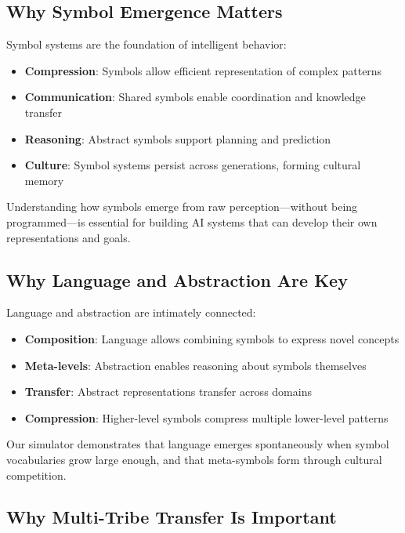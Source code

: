 \documentclass[11pt,a4paper]{article}
\begin{document}
\subsection{Why Symbol Emergence Matters}

Symbol systems are the foundation of intelligent behavior:

\begin{itemize}
    \item \textbf{Compression}: Symbols allow efficient representation of complex patterns
    \item \textbf{Communication}: Shared symbols enable coordination and knowledge transfer
    \item \textbf{Reasoning}: Abstract symbols support planning and prediction
    \item \textbf{Culture}: Symbol systems persist across generations, forming cultural memory
\end{itemize}

Understanding how symbols emerge from raw perception—without being programmed—is essential for building AI systems that can develop their own representations and goals.

\subsection{Why Language and Abstraction Are Key}

Language and abstraction are intimately connected:

\begin{itemize}
    \item \textbf{Composition}: Language allows combining symbols to express novel concepts
    \item \textbf{Meta-levels}: Abstraction enables reasoning about symbols themselves
    \item \textbf{Transfer}: Abstract representations transfer across domains
    \item \textbf{Compression}: Higher-level symbols compress multiple lower-level patterns
\end{itemize}

Our simulator demonstrates that language emerges spontaneously when symbol vocabularies grow large enough, and that meta-symbols form through cultural competition.

\subsection{Why Multi-Tribe Transfer Is Important}
\end{document}
